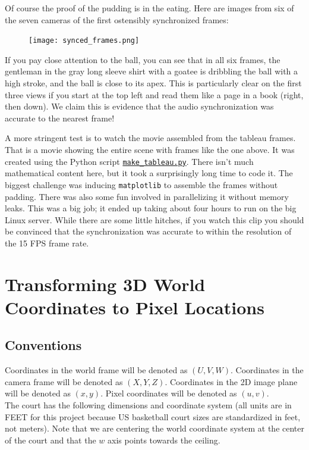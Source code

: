 \documentclass{article}
\begin{document}
Of course the proof of the pudding is in the eating.  
Here are images from six of the seven cameras of the first ostensibly synchronized frames:
\begin{figure}[H]
\center
\texttt{[image: synced\_frames.png]}
\end{figure}

If you pay close attention to the ball, you can see that in all six frames, the gentleman
in the gray long sleeve shirt with a goatee is dribbling the ball with a high stroke, 
and the ball is close to its apex.  This is particularly clear on the first three views
if you start at the top left and read them like a page in a book (right, then down).
We claim this is evidence that the audio synchronization was accurate to the nearest frame!

A more stringent test is to watch the movie assembled from the tableau frames.
That is a movie showing the entire scene with frames like the one above.
It was created using the Python script
\href{https://github.com/Harvard-AM-205-Basketball/Basketball/blob/master/src/make_tableaux.py}
{\texttt{make\_tableau.py}}.  
There isn't much mathematical content here, but it took a surprisingly long time to code it.  
The biggest challenge was inducing \texttt{matplotlib} to assemble the frames without padding.
There was also some fun involved in parallelizing it without memory leaks.
This was a big job; it ended up taking about four hours to run on the big Linux server.
While there are some little hitches, if you watch this clip you should be convinced that
the synchronization was accurate to within the resolution of the 15 FPS frame rate.

\newpage
\section{Transforming 3D World Coordinates to Pixel Locations}
\subsection{Conventions}
Coordinates in the world frame will be denoted as $(U, V, W)$. Coordinates in the camera frame will be denoted as $(X, Y, Z)$. 
Coordinates in the 2D image plane will be denoted as $(x, y)$. Pixel coordinates will be denoted as $(u, v)$. \\

The court has the following dimensions and coordinate system 
(all units are in FEET for this project because US basketball court sizes are standardized in feet, not meters). 
Note that we are centering the world coordinate system at the center of the court and that the $w$ axis points towards the ceiling.
\end{document}
